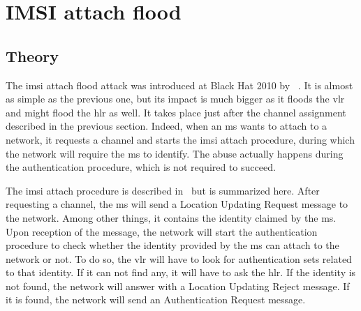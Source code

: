       \iffalse
      \begin{figure}[p]
        \centering
        \texttt{[image: log\_dos\_rach4]}
        \caption{The MS sees Immediate Assignment messages with an RA
        of \code{0x00}, but discards them. Same in Wireshark.}
        \label{fig:log_dos_rach4}
      \end{figure}
      \fi
   
    \section{IMSI attach flood}

    \iffalse

http://www.etsi.org/deliver/etsi_ts/129000_129099/129002/12.07.00_60/ts_129002v120700p.pdf
look at page 480 for a flow diagram of the whole location update
procedure!!!


    \fi
      \subsection{Theory}

      The \gls{imsi} attach flood attack was introduced at Black Hat
      2010 by ~\cite{the_grugq_base_2010}. It is almost
      as simple as the previous one, but its impact is much bigger as it
      floods the \gls{vlr} and might flood the \gls{hlr} as well. It
      takes place just after the channel assignment described in the
      previous section. Indeed, when an \gls{ms} wants to attach to a
      network, it requests a channel and starts the \gls{imsi} attach
      procedure, during which the network will require the \gls{ms} to
      identify. The abuse actually happens during the authentication
      procedure, which is not required to succeed.

      The \gls{imsi} attach procedure is described
      in~ but is summarized here. After
      requesting a channel, the \gls{ms} will send a Location Updating
      Request message to the network. Among other things, it contains
      the identity claimed by the \gls{ms}. Upon reception of the
      message, the network will start the authentication procedure to
      check whether the identity provided by the \gls{ms} can attach to
      the network or not. To do so, the \gls{vlr} will have to look for
      authentication sets related to that identity. If it can not find
      any, it will have to ask the \gls{hlr}. If the identity is not
      found, the network will answer with a Location Updating Reject
      message. If it is found, the network will send an Authentication
      Request message.

